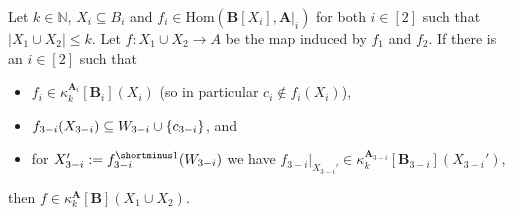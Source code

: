 \documentclass[a4paper,english, thm-restate]{lipics-v2021}
\newcommand{\nat}{\mathbb{N}}
\DeclarePairedDelimiter\set{\lbrace}{\rbrace}
\newcommand{\inv}[1]{#1^{\shortminus 1}}
\newcommand{\StructA}{\mathbf{A}}
\newcommand{\StructB}{\mathbf{B}}
\newcommand{\kcol}[3]{\kappa_{#1}^{#2}[#3]}
\newcommand{\restrict}[2]{#1|_{#2}}
\newcommand{\Hom}[2]{\mathrm{Hom}(#1,#2)}
\begin{document}
	\begin{lemma}
		\label{lem:hom-or-k-consistency}
		Let $k \in \nat$, $X_i \subseteq B_i$  and $f_i \in \Hom{\StructB[X_i]}{\restrict{\StructA}{i}}$ for both $i\in[2]$
		such that $|X_1 \cup X_2|\leq k$.
		Let $f \colon X_1\cup X_2 \to A$ be the map induced by $f_1$ and $f_2$.
		If there is an $i\in[2]$ such that  
		\begin{itemize}
			\item $f_i \in \kcol{k}{\StructA_i}{\StructB_i}(X_i)$
			(so in particular $c_i \notin f_i(X_i)$),
			\item $f_{3-i}(X_{3-i}) \subseteq W_{3-i} \cup \set{c_{3-i}}$, and
			\item for $X_{3-i}' := \inv{f_{3-i}}(W_{3-i})$ we have $\restrict{f_{3-i}}{X_{3-i}'} \in \kcol{k}{\StructA_{3-i}}{\StructB_{3-i}}(X_{3-i}')$,
		\end{itemize}
		then $f \in \kcol{k}{\StructA}{\StructB}(X_1 \cup X_2)$.
	\end{lemma}
\end{document}
